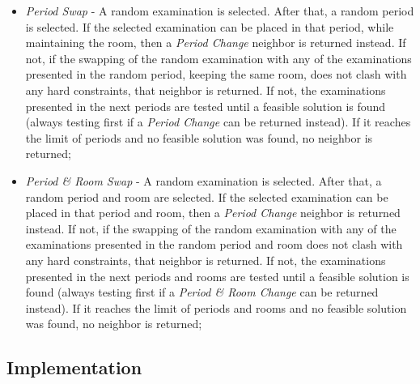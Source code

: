 \begin{itemize}
	\item \textit{Period Swap} -  A random examination is selected. After that, a random period is selected. If the selected examination can be placed in that period, while maintaining the room, then a \textit{Period Change} neighbor is returned instead. If not, if the swapping of the random examination with any of the examinations presented in the random period, keeping the same room, does not clash with any hard constraints, that neighbor is returned. If not, the examinations presented in the next periods are tested until a feasible solution is found (always testing first if a \textit{Period Change} can be returned instead). If it reaches the limit of periods and no feasible solution was found, no neighbor is returned;\\
	
	\item \textit{Period \& Room Swap} - A random examination is selected. After that, a random period and room are selected. If the selected examination can be placed in that period and room, then a \textit{Period Change} neighbor is returned instead. If not, if the swapping of the random examination with any of the examinations presented in the random period and room does not clash with any hard constraints, that neighbor is returned. If not, the examinations presented in the next periods and rooms are tested until a feasible solution is found (always testing first if a \textit{Period \& Room Change} can be returned instead). If it reaches the limit of periods and rooms and no feasible solution was found, no neighbor is returned;
\end{itemize}

\subsection{Implementation}

